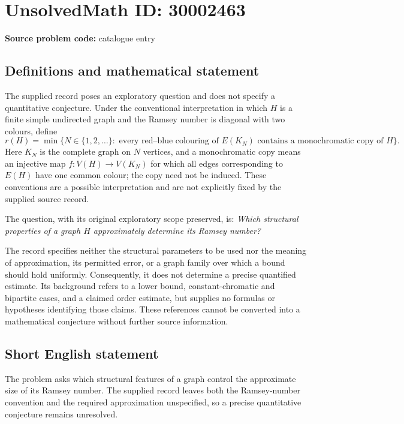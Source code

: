 \documentclass[11pt]{article}
\begin{document}
\section*{UnsolvedMath ID: 30002463}
\textbf{Source problem code:} catalogue entry
\subsection{Definitions and mathematical statement}
The supplied record poses an exploratory question and does not specify a quantitative conjecture. Under the conventional interpretation in which \(H\) is a finite simple undirected graph and the Ramsey number is diagonal with two colours, define
\[
r(H)=\min\bigl\{N\in\{1,2,\ldots\}:\text{ every red--blue colouring of }E(K_N)\text{ contains a monochromatic copy of }H\bigr\}.
\]
Here \(K_N\) is the complete graph on \(N\) vertices, and a monochromatic copy means an injective map \(f:V(H)\to V(K_N)\) for which all edges corresponding to \(E(H)\) have one common colour; the copy need not be induced. These conventions are a possible interpretation and are not explicitly fixed by the supplied source record.

The question, with its original exploratory scope preserved, is: \emph{Which structural properties of a graph \(H\) approximately determine its Ramsey number?}

The record specifies neither the structural parameters to be used nor the meaning of approximation, its permitted error, or a graph family over which a bound should hold uniformly. Consequently, it does not determine a precise quantified estimate. Its background refers to a lower bound, constant-chromatic and bipartite cases, and a claimed order estimate, but supplies no formulas or hypotheses identifying those claims. These references cannot be converted into a mathematical conjecture without further source information.
\subsection{Short English statement}
The problem asks which structural features of a graph control the approximate size of its Ramsey number. The supplied record leaves both the Ramsey-number convention and the required approximation unspecified, so a precise quantitative conjecture remains unresolved.
\end{document}

